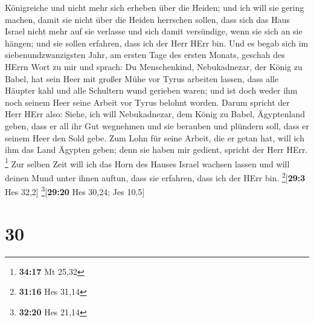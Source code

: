Königreiche und nicht mehr sich erheben über die Heiden; und ich will
sie gering machen, damit sie nicht über die Heiden herrschen sollen,
 dass sich das Haus Israel nicht mehr auf sie verlasse
und sich damit versündige, wenn sie sich an sie hängen; und sie sollen
erfahren, dass ich der Herr HErr bin.  Und es begab sich
im siebenundzwanzigsten Jahr, am ersten Tage des ersten Monats, geschah
des HErrn Wort zu mir und sprach:  Du Menschenkind,
Nebukadnezar, der König zu Babel, hat sein Heer mit großer Mühe vor
Tyrus arbeiten lassen, dass alle Häupter kahl und alle Schultern wund
gerieben waren; und ist doch weder ihm noch seinem Heer seine Arbeit vor
Tyrus belohnt worden.  Darum spricht der Herr HErr also:
Siehe, ich will Nebukadnezar, dem König zu Babel, Ägyptenland geben,
dass er all ihr Gut wegnehmen und sie berauben und plündern soll, dass
er seinem Heer den Sold gebe.  Zum Lohn für seine Arbeit,
die er getan hat, will ich ihm das Land Ägypten geben; denn sie haben
mir gedient, spricht der Herr HErr. \footnote{\textbf{34:17} Mt 25,32}
 Zur selben Zeit will ich das Horn des Hauses Israel
wachsen lassen und will deinen Mund unter ihnen auftun, dass sie
erfahren, dass ich der HErr bin. \footnote{\textbf{31:16} Hes 31,14}{[}\textbf{29:3}
Hes 32,2{]} \footnote{\textbf{32:20} Hes 21,14}{[}\textbf{29:20} Hes
30,24; Jes 10,5{]}

\hypertarget{section-29}{%
\section{30}\label{section-29}}

